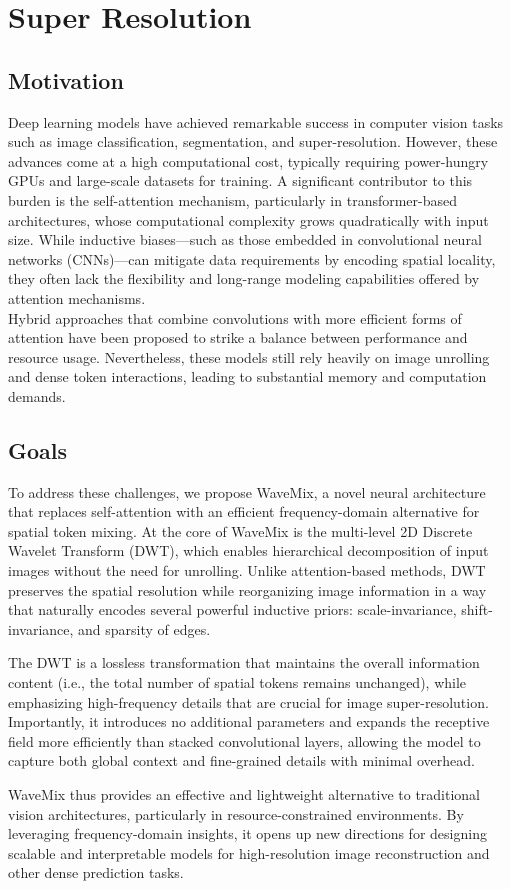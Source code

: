 \section{Super Resolution}
\subsection{Motivation}
Deep learning models have achieved remarkable success in computer vision tasks such as image classification, segmentation, and super-resolution. However, these advances come at a high computational cost, typically requiring power-hungry GPUs and large-scale datasets for training. A significant contributor to this burden is the self-attention mechanism, particularly in transformer-based architectures, whose computational complexity grows quadratically with input size. While inductive biases—such as those embedded in convolutional neural networks (CNNs)—can mitigate data requirements by encoding spatial locality, they often lack the flexibility and long-range modeling capabilities offered by attention mechanisms.\\
Hybrid approaches that combine convolutions with more efficient forms of attention have been proposed to strike a balance between performance and resource usage. Nevertheless, these models still rely heavily on image unrolling and dense token interactions, leading to substantial memory and computation demands.

\subsection{Goals}
To address these challenges, we propose WaveMix, a novel neural architecture that replaces self-attention with an efficient frequency-domain alternative for spatial token mixing. At the core of WaveMix is the multi-level 2D Discrete Wavelet Transform (DWT), which enables hierarchical decomposition of input images without the need for unrolling. Unlike attention-based methods, DWT preserves the spatial resolution while reorganizing image information in a way that naturally encodes several powerful inductive priors: scale-invariance, shift-invariance, and sparsity of edges.

The DWT is a lossless transformation that maintains the overall information content (i.e., the total number of spatial tokens remains unchanged), while emphasizing high-frequency details that are crucial for image super-resolution. Importantly, it introduces no additional parameters and expands the receptive field more efficiently than stacked convolutional layers, allowing the model to capture both global context and fine-grained details with minimal overhead.

WaveMix thus provides an effective and lightweight alternative to traditional vision architectures, particularly in resource-constrained environments. By leveraging frequency-domain insights, it opens up new directions for designing scalable and interpretable models for high-resolution image reconstruction and other dense prediction tasks.